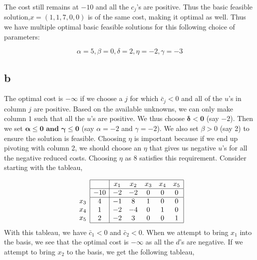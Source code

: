 The cost still remains at $-10$ and all the $c_j$'s are positive. Thus the basic feasible solution,$x = (1,1,7,0,0)$ is of the same cost, making it optimal as well. Thus we have multiple optimal basic feasible solutions for this following choice of parameters:

$$
\alpha=5, \beta=0, \delta=2, \eta=-2, \gamma=-3
$$

\subsection*{b}
The optimal cost is $- \infty$ if we choose a $j$ for which $\bar{c}_j < 0$ and all of the $u$'s in column $j$ are positive. Based on the available unknowns, we can only make column $1$ such that all the $u$'s are positive. We thus choose $\boldsymbol{\delta < 0}$ (say $-2$). Then we set $\boldsymbol{\alpha \le 0 \text{ and } \gamma \le 0}$ (say $\alpha = -2$ and $\gamma = -2$). We also set $\beta > 0 $ (say 2) to ensure the solution is feasible. Choosing $\eta$ is important because if we end up pivoting with column 2, we should choose an $\eta$ that gives us negative $u$'s for all the negative reduced costs. Choosing $\eta$ as 8 satisfies this requirement. Consider starting with the tableau, 

$$
\begin{array}{c}
\\
 \\
x_3 \\
x_4 \\ 
x_5 \\
\end{array}
\begin{array}{|c|ccccc|}
    \hline
    & x_1 & x_2 & x_3 & x_4 & x_5\\ \hline
  -10 & -2 & -2 & 0 & 0 & 0\\ \hline
  4 & -1 & 8 & 1 & 0 & 0\\
  1 & -2 & -4 & 0 & 1 & 0\\
  2 & -2 & 3 & 0 & 0 & 1\\\hline
\end{array}
$$
With this tableau, we have $\bar{c}_1<0$ and $\bar{c}_2<0$. When we attempt to bring $x_1$ into the basis, we see that the optimal cost is $- \infty$ as all the $d$'s are negative. If we attempt to bring $x_2$ to the basis, we get the following tableau,


